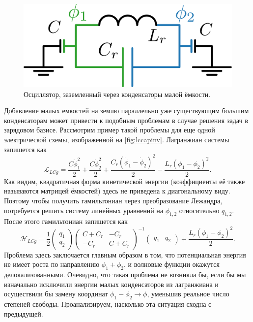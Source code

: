 \documentclass[14pt, a4paper]{extreport}
\numberwithin{equation}{section}
\begin{document}
\begin{figure}
	\centering
	\includegraphics[width=0.5\linewidth]{Pictures/lc_cap_inv}
	\caption{Осциллятор, заземленный через конденсаторы малой ёмкости.}
	\label{fig:lccapinv}
\end{figure}

Добавление малых емкостей на землю параллельно уже существующим большим конденсаторам может привести к подобным проблемам в случае решения задач в зарядовом базисе. Рассмотрим пример такой проблемы для еще одной электрической схемы, изображенной на \autoref{fig:lccapinv}. Лагранжиан системы запишется как
\begin{equation}
	\mathcal{L}_{LCg} = \frac{C \dot \phi_1^2}{2} + \frac{C \dot \phi_2^2}{2} + \frac{C_r\left(\dot\phi_1 - \dot\phi_2\right)^2}{2} - \frac{L_r \left(\phi_1  - \phi_2\right)^2}{2}.\label{eq:l_lcg}
\end{equation}
Как видим, квадратичная форма кинетической энергии (коэффициенты её также называются матрицей ёмкостей) здесь не приведена к диагональному виду. Поэтому чтобы получить гамильтониан через преобразование Лежандра, потребуется решить систему линейных уравнений на $\phi_{1,2}$ относительно $q_{1,2}$. После этого гамильтониан запишется как 
\begin{equation}
	\mathcal{H}_{LCg} = \frac{1}{2} \left(\begin{matrix} q_1\\q_2\end{matrix}\right) \left(\begin{matrix}
	C+C_r & -C_r \\
	-C_r & C+C_r
	\end{matrix}\right)^{-1}\left(\begin{matrix} q_1&q_2\end{matrix}\right)+\frac{L_r \left(\phi_1  - \phi_2\right)^2}{2}.
\end{equation}
Проблема здесь заключается главным образом в том, что потенциальная энергия не имеет роста по направлению $\phi_1 + \phi_2$, и волновые функции окажутся делокализованными. Очевидно, что такая проблема не возникла бы, если бы мы изначально исключили энергии малых конденсаторов из лагранжиана и осуществили бы замену координат $\phi_1 - \phi_2 \rightarrow \phi$, уменьшив реальное число степеней свободы. Проанализируем, насколько эта ситуация сходна с предыдущей.
\end{document}
